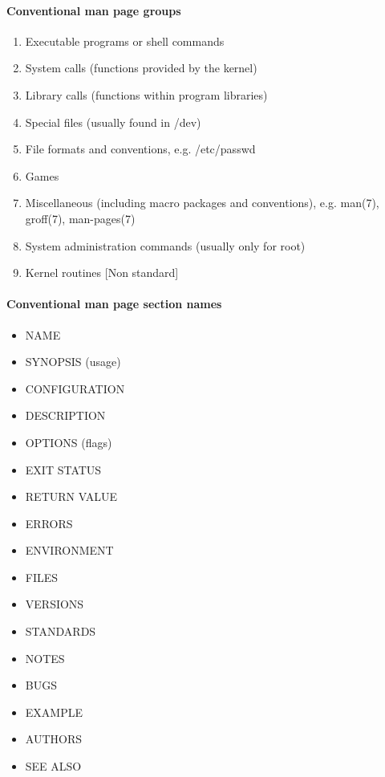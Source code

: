 \label{a:man}

\paragraph{Conventional man page groups}
\begin{enumerate}
  \item Executable programs or shell commands
  \item System calls (functions provided by the kernel)
  \item Library calls (functions within program libraries)
  \item Special files (usually found in /dev)
  \item File formats and conventions, e.g. /etc/passwd
  \item Games
  \item Miscellaneous (including macro packages and conventions),
    e.g. man(7), groff(7), man-pages(7)
  \item System administration commands (usually only for root)
  \item Kernel routines [Non standard]
\end{enumerate}

\paragraph{Conventional man page section names}
\begin{itemize}
  \item NAME
  \item SYNOPSIS (usage)
  \item CONFIGURATION
  \item DESCRIPTION
  \item OPTIONS (flags)
  \item EXIT STATUS
  \item RETURN VALUE
  \item ERRORS
  \item ENVIRONMENT
  \item FILES
  \item VERSIONS
  \item STANDARDS
  \item NOTES
  \item BUGS
  \item EXAMPLE
  \item AUTHORS
  \item SEE ALSO
\end{itemize}
